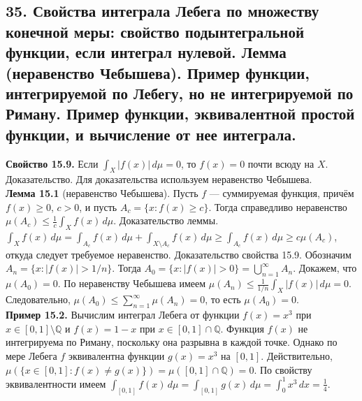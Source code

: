 \documentclass[12pt]{article}
\begin{document}
\subsection*{35. Свойства интеграла Лебега по множеству конечной меры: свойство подынтегральной
функции, если интеграл нулевой. Лемма (неравенство Чебышева). Пример функции,
интегрируемой по Лебегу, но не интегрируемой по Риману. Пример функции,
эквивалентной простой функции, и вычисление от нее интеграла.}
\textbf{Свойство 15.9.} Если $\int_X |f(x)|\,d\mu = 0$, то $f(x) = 0$ почти всюду на $X$. Доказательство. Для доказательства используем неравенство Чебышева. \\\textbf{Лемма 15.1} (неравенство Чебышева). Пусть $f$ — суммируемая функция, причём $f(x) \geq 0$, $c > 0$, и пусть $A_c = \{x : f(x) \geq c\}$. Тогда справедливо неравенство $\mu(A_c) \leq \tfrac{1}{c}\int_X f(x)\,d\mu$. Доказательство леммы. $\int_X f(x)\,d\mu = \int_{A_c} f(x)\,d\mu + \int_{X\setminus A_c} f(x)\,d\mu \geq \int_{A_c} f(x)\,d\mu \geq c\mu(A_c)$, откуда следует требуемое неравенство. Доказательство свойства 15.9. Обозначим $A_n = \{x : |f(x)| > 1/n\}$. Тогда $A_0 = \{x : |f(x)| > 0\} = \bigcup_{n=1}^\infty A_n$. Докажем, что $\mu(A_0) = 0$. По неравенству Чебышева имеем $\mu(A_n) \leq \tfrac{1}{1/n}\int_X |f(x)|\,d\mu = 0$. Следовательно, $\mu(A_0) \leq \sum_{n=1}^\infty \mu(A_n) = 0$, то есть $\mu(A_0) = 0$. \\\textbf{Пример 15.2.} Вычислим интеграл Лебега от функции $f(x) = x^3$ при $x \in [0,1]\setminus \mathbb{Q}$ и $f(x) = 1-x$ при $x \in [0,1]\cap \mathbb{Q}$. Функция $f(x)$ не интегрируема по Риману, поскольку она разрывна в каждой точке. Однако по мере Лебега $f$ эквивалентна функции $g(x) = x^3$ на $[0,1]$. Действительно, $\mu(\{x \in [0,1] : f(x) \neq g(x)\}) = \mu([0,1]\cap \mathbb{Q}) = 0$. По свойству эквивалентности имеем $\int_{[0,1]} f(x)\,d\mu = \int_{[0,1]} g(x)\,d\mu = \int_0^1 x^3\,dx = \tfrac{1}{4}$.

\end{document}

